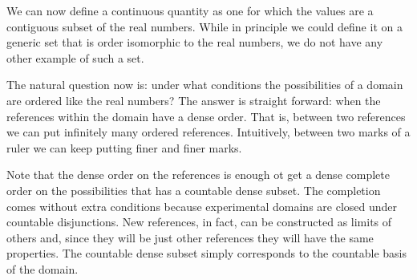 \documentclass[11pt,letterpaper,fleqn]{memoir} %
\begin{document}
We can now define a continuous quantity as one for which the values are a contiguous subset of the real numbers. While in principle we could define it on a generic set that is order isomorphic to the real numbers, we do not have any other example of such a set.

The natural question now is: under what conditions the possibilities of a domain are ordered like the real numbers? The answer is straight forward: when the references within the domain have a dense order. That is, between two references we can put infinitely many ordered references. Intuitively, between two marks of a ruler we can keep putting finer and finer marks.

Note that the dense order on the references is enough ot get a dense complete order on the possibilities that has a countable dense subset. The completion comes without extra conditions because experimental domains are closed under countable disjunctions. New references, in fact, can be constructed as limits of others and, since they will be just other references they will have the same properties. The countable dense subset simply corresponds to the countable basis of the domain.
\end{document}
